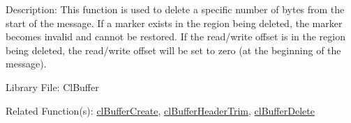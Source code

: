 \begin{Desc}
\item[Description:]This function is used to delete a specific number of bytes from the start of the message. If a marker exists in the region being deleted, the marker becomes invalid and cannot be restored. If the read/write offset is in the region being deleted, the read/write offset will be set to zero (at the beginning of the message).\end{Desc}
\begin{Desc}
\item[Library File:]Cl\-Buffer\end{Desc}
\begin{Desc}
\item[Related Function(s):]\hyperlink{pagebuf103}{cl\-Buffer\-Create}, \hyperlink{pagebuf124}{cl\-Buffer\-Header\-Trim}, 
\hyperlink{pagebuf105}{cl\-Buffer\-Delete} \end{Desc}


\newpage
